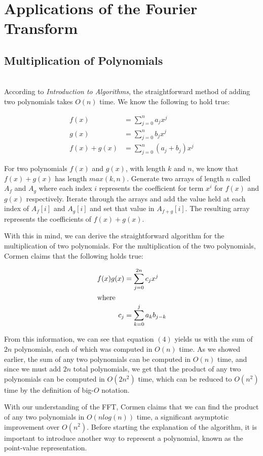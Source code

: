 \documentclass{amsproc}
\begin{document}
\section{Applications of the Fourier Transform}

\subsection{Multiplication of Polynomials}

\mbox{}	 \\
\indent According to \textit{Introduction to Algorithms}, the straightforward method of adding two polynomials takes $O(n)$ time. We know the following to hold true:

\begin{align}
f(x) &= \sum_{j = 0}^{n} a_j x^j \\
g(x) &= \sum_{j = 0}^{n} b_j x^j \\ 
f(x) + g(x) &= \sum_{j = 0}^{n} (a_j + b_j)  x^j 
\end{align}

For two polynomials $f(x)$ and $g(x)$, with length $k$ and $n$, we know that $f(x) + g(x)$ has length $max(k, n)$. Generate two arrays of length $n$ called $A_f$ and $A_g$ where each index $i$ represents the coefficient for term $x^i$ for $f(x)$ and $g(x)$ respectively. Iterate through the arrays and add the value held at each index of $A_f[i]$ and $A_g[i]$ and set that value in $A_{f+g}[i]$. The resulting array represents the coefficients of $f(x)+g(x)$.

With this in mind, we can derive the straightforward algorithm for the multiplication of two polynomials. For the multiplication of the two polynomials, Cormen claims that the following holds true:

\begin{align}
f(x)g(x) &= \sum_{j = 0}^{2n} c_j  x^j \\
\intertext{where}
c_j &=  \sum_{k = 0}^{j} a_k b_{j-k}
\end{align}

From this information, we can see that equation $(4)$ yields us with the sum of $2n$ polynomials, each of which was computed in $O(n)$ time. As we showed earlier, the sum of any two polynomials can be computed in $O(n)$ time, and since we must add $2n$ total polynomials, we get that the product of any two polynomials can be computed in $O(2n^2)$ time, which can be reduced to $O(n^2)$ time by the definition of big-$O$ notation.

With our understanding of the FFT, Cormen claims that we can find the product of any two polynomials in $O(nlog(n))$ time, a significant asymptotic improvement over $O(n^2)$.  Before starting the explanation of the algorithm, it is important to introduce another way to represent a polynomial, known as the point-value representation. 
\end{document}
